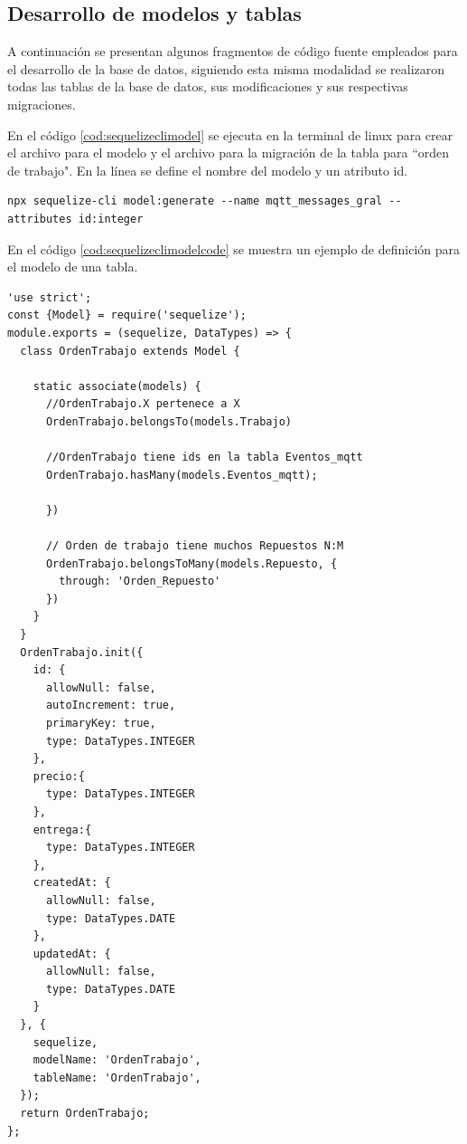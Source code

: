 \subsection{Desarrollo de modelos y tablas}
\label{subsec:modelobasededatos}



A continuación se presentan algunos fragmentos de código fuente empleados para el desarrollo de la base de datos, siguiendo esta misma modalidad se realizaron todas las tablas de la base de datos, sus modificaciones y sus respectivas migraciones.


En el código \ref{cod:sequelizeclimodel} se ejecuta en la terminal de linux para crear el archivo para el modelo y el archivo para la migración de la tabla para ``orden de trabajo". En la línea se define el nombre del modelo y un atributo id. 

\begin{lstlisting}[label=cod:sequelizeclimodel,caption=Código CLI para crear modelo y migración en Sequelize.]
npx sequelize-cli model:generate --name mqtt_messages_gral --attributes id:integer
\end{lstlisting}

En el código \ref{cod:sequelizeclimodelcode} se muestra un ejemplo de definición para el modelo de una tabla.

\begin{lstlisting}[label=cod:sequelizeclimodelcode,caption= Código para un modelo en Sequelize.]
'use strict';
const {Model} = require('sequelize');
module.exports = (sequelize, DataTypes) => {
  class OrdenTrabajo extends Model {
    
    static associate(models) {
      //OrdenTrabajo.X pertenece a X
      OrdenTrabajo.belongsTo(models.Trabajo)
      
      //OrdenTrabajo tiene ids en la tabla Eventos_mqtt
      OrdenTrabajo.hasMany(models.Eventos_mqtt);

      })

      // Orden de trabajo tiene muchos Repuestos N:M
      OrdenTrabajo.belongsToMany(models.Repuesto, {
        through: 'Orden_Repuesto'
      })
    }
  }
  OrdenTrabajo.init({
    id: {
      allowNull: false,
      autoIncrement: true,
      primaryKey: true,
      type: DataTypes.INTEGER
    },
    precio:{
      type: DataTypes.INTEGER
    },
    entrega:{
      type: DataTypes.INTEGER
    },
    createdAt: {
      allowNull: false,
      type: DataTypes.DATE
    },
    updatedAt: {
      allowNull: false,
      type: DataTypes.DATE
    }
  }, {
    sequelize,
    modelName: 'OrdenTrabajo',
    tableName: 'OrdenTrabajo',
  });
  return OrdenTrabajo;
};

\end{lstlisting}

